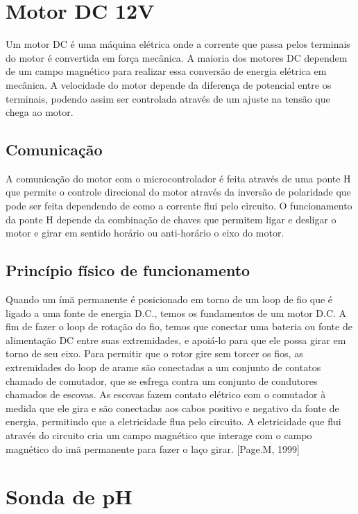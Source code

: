 \section{Motor DC 12V}

Um motor DC é uma máquina elétrica onde a corrente que passa pelos terminais do motor é convertida em força mecânica. A maioria dos motores DC dependem de um campo magnético para realizar essa conversão de energia elétrica em mecânica. A velocidade do motor depende da diferença de potencial entre os terminais, podendo assim ser controlada  através de um ajuste na tensão que chega ao motor\cite{metmotor2015}.

\subsection{Comunicação}

A comunicação do motor com o microcontrolador é feita através de uma ponte H que permite o controle direcional do motor através da inversão de polaridade que pode ser feita dependendo de como a corrente flui pelo circuito. O funcionamento da ponte H depende da combinação de chaves que permitem ligar e desligar o motor e girar em sentido horário ou anti-horário o eixo do motor.

\subsection{Princípio físico de funcionamento}

Quando um ímã permanente é posicionado em torno de um loop de fio que é ligado a uma fonte de energia D.C., temos os fundamentos de um motor D.C. A fim de fazer o loop de rotação do fio, temos que conectar uma bateria ou fonte de alimentação DC entre suas extremidades, e apoiá-lo para que ele possa girar em torno de seu eixo. Para permitir que o rotor gire sem torcer os fios, as extremidades do loop de arame são conectadas a um conjunto de contatos chamado de comutador, que se esfrega contra um conjunto de condutores chamados de escovas. As escovas fazem contato elétrico com o comutador à medida que ele gira e são conectadas aos cabos positivo e negativo da fonte de energia, permitindo que a eletricidade flua pelo circuito. A eletricidade que flui através do circuito cria um campo magnético que interage com o campo magnético do imã permanente para fazer o laço girar\cite{page1999}. [Page.M, 1999]

\section{Sonda de pH}


